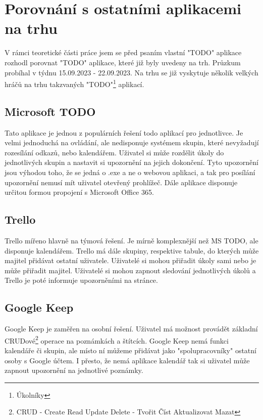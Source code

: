 \chapter{Porovnání s ostatními aplikacemi na trhu}
V rámci teoretické části práce jsem se před psaním vlastní "TODO" aplikace rozhodl porovnat "TODO" aplikace, které již byly uvedeny na trh. Průzkum probíhal v týdnu 15.09.2023 - 22.09.2023.
Na trhu se již vyskytuje několik velkých hráčů na trhu takzvaných "TODO"\footnote{Úkolníky} aplikací.
\section{Microsoft TODO}
Tato aplikace je jednou z populárních řešení todo aplikací pro jednotlivce. Je velmi jednoduchá na ovládání, ale nedisponuje systémem skupin, které nevyžadují rozesílání odkazů, nebo kalendářem. Uživatel si může rozdělit úkoly do jednotlivých skupin a nastavit si upozornění na jejich dokončení. Tyto upozornění jsou výhodou toho, že se jedná o .exe a ne o webovou aplikaci, a tak pro posílání upozornění nemusí mít uživatel otevřený prohlížeč. Dále aplikace disponuje určitou formou propojení s Microsoft Office 365.
\section{Trello}
Trello mířeno hlavně na týmová řešení. Je mírně komplexnější než MS TODO, ale disponuje kalendářem. Trello má dále skupiny, respektive tabule, do kterých může majitel přidávat ostatní uživatele. Uživatelé si mohou přiřadit úkoly sami nebo je může přiřadit majitel. Uživatelé si mohou zapnout sledování jednotlivých úkolů a Trello je poté informuje upozorněními na stránce.
\section{Google Keep}
Google Keep je zaměřen na osobní řešení. Uživatel má možnost provádět základní CRUDové\footnote{CRUD - Create Read Update Delete - Tvořit Číst Aktualizovat Mazat} operace na poznámkách a štítcích. Google Keep nemá funkci kalendáře či skupin, ale místo ní můžeme přidávat jako "spolupracovníky" ostatní osoby s Google účtem. I přesto, že nemá aplikace kalendář tak si uživatel může zapnout upozornění na jednotlivé poznámky.